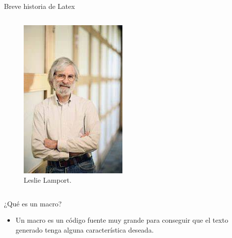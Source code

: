 \documentclass[aspectratio=169, 10pt]{beamer}
\begin{document}
\begin{frame}{Breve historia de Latex}
\begin{columns}
    \begin{column}{.28\linewidth}
            \begin{itemize}
            \justifying
            \begin{figure}
                \centering
                \includegraphics[scale=0.32]{LeslieLamport.jpg} 
                \hspace{-8mm} \caption*{Leslie Lamport.}
                \label{}
            \end{figure}    
                
            \end{itemize}
    \end{column}
\end{columns}

\vspace{-5mm} \pause
        \begin{alertblock}{¿Qué es un macro?}
            \begin{itemize}
            \justifying
                \item Un macro es un código fuente muy grande para conseguir que el texto generado tenga alguna característica deseada.
            \end{itemize}
        \end{alertblock}
    
\end{frame}
\end{document}
